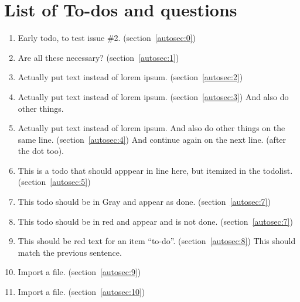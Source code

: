 \section{List of To-dos and questions}
    \begin{enumerate}[noitemsep]
        \item {\color{red}Early todo, to test issue \#2.} (section~\ref{autosec:0})
        \item {\color{ForestGreen}Are all these necessary?} (section~\ref{autosec:1})
        \item {\color{red}Actually put text instead of lorem ipsum.} (section~\ref{autosec:2})
        \item {\color{red}Actually put text instead of lorem ipsum.} (section~\ref{autosec:3})
{\color{red}And also do other things.}
        \item {\color{red}Actually put text instead of lorem ipsum. And also do other things on the same line.} (section~\ref{autosec:4})
{\color{red}And continue again on the next line. (after the dot too).}
        \item {\color{red}This is a todo that should apppear in line here, but itemized in the todolist.} (section~\ref{autosec:5})
        \item {\color{Gray}This todo should be in Gray and appear as done.} (section~\ref{autosec:7})
        \item {\color{red}This todo should be in red and appear and is not done.} (section~\ref{autosec:7})
        \item {\color{red}This should be red text for an item ``to-do''.} (section~\ref{autosec:8})
{\color{red}This should match the previous sentence.}
        \item {\color{red}Import a file.} (section~\ref{autosec:9})
        \item {\color{red}Import a file.} (section~\ref{autosec:10})
    \end{enumerate}

